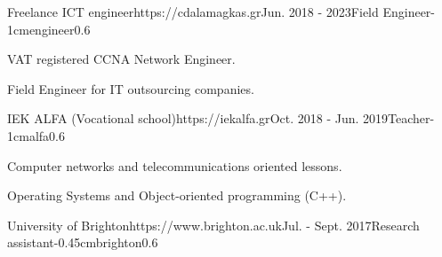\documentclass{mycv}
\begin{document}
	\vspace*{0.5cm}
	
	\begin{EntryDatedLogo}{Freelance ICT engineer}{https://cdalamagkas.gr}{Jun. 2018 - 2023}{Field Engineer}{-1cm}{engineer}{0.6}
		\begin{Itemize}
			\item VAT registered CCNA Network Engineer.
			\item Field Engineer for IT outsourcing companies.
		\end{Itemize}
	\end{EntryDatedLogo}

	\vspace*{0.5cm}	



	\begin{EntryDatedLogo}{IEK ALFA (Vocational school)}{https://iekalfa.gr}{Oct. 2018 - Jun. 2019}{Teacher}{-1cm}{alfa}{0.6}
		\begin{Itemize}
			\item Computer networks and telecommunications oriented lessons.
			\item Operating Systems and Object-oriented programming (C++).
		\end{Itemize}
	\end{EntryDatedLogo}

	\vspace*{0.5cm}
		
	\begin{EntryDatedLogo}{University of Brighton}{https://www.brighton.ac.uk}{Jul. - Sept. 2017}{Research assistant}{-0.45cm}{brighton}{0.6}
	\end{EntryDatedLogo}
\end{document}
